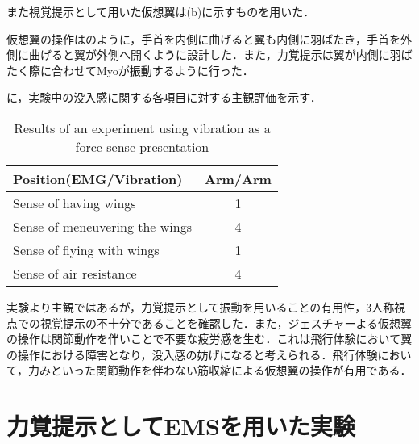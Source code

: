     また視覚提示として用いた仮想翼は(b)に示すものを用いた．

    仮想翼の操作はのように，手首を内側に曲げると翼も内側に羽ばたき，手首を外側に曲げると翼が外側へ開くように設計した．また，力覚提示は翼が内側に羽ばたく際に合わせてMyoが振動するように行った．

    に，実験中の没入感に関する各項目に対する主観評価を示す．
        \begin{table}[h]
            \begin{center}
                \caption{Results of an experiment using vibration as a force sense presentation}
                \scalebox{0.75}
                {
                    \begin{tabular}{l|c}
                        \hline
                        Position(EMG/Vibration) & Arm/Arm \\\hline
                        Sense of having wings & 1 \\
                        Sense of meneuvering the wings & 4 \\
                        Sense of flying with wings & 1 \\
                        Sense of air resistance & 4 \\\hline
                    \end{tabular}
                }
            \end{center}
        \end{table}
    

    実験より主観ではあるが，力覚提示として振動を用いることの有用性，3人称視点での視覚提示の不十分であることを確認した．また，ジェスチャーよる仮想翼の操作は関節動作を伴いことで不要な疲労感を生む．これは飛行体験において翼の操作における障害となり，没入感の妨げになると考えられる．飛行体験において，力みといった関節動作を伴わない筋収縮による仮想翼の操作が有用である．

    \section{力覚提示としてEMSを用いた実験}


